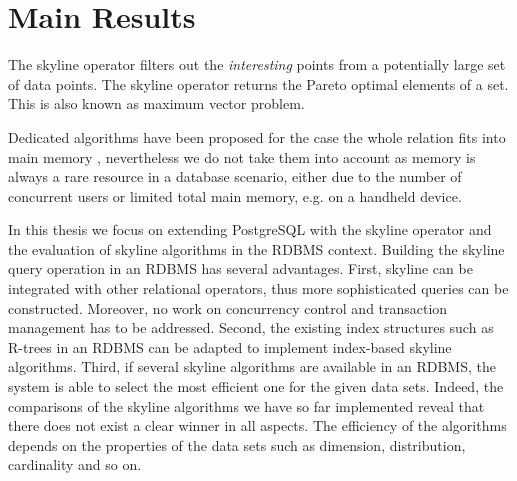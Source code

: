 % 
% 
% 
% 
% 
% 
% 
%


\section{Main Results} 
The skyline operator \citep{Borzsonyi2001} filters out the
\emph{interesting} points from a potentially large set of data
points. The skyline operator returns the Pareto optimal elements of a set. This is also known as maximum vector
problem.

Dedicated algorithms have been proposed for the case the whole relation
fits into main memory \citep{Preparata1985}, nevertheless we do not
take them into account as memory is always a rare resource in a
database scenario, either due to the number of concurrent users or
limited total main memory, e.g. on a handheld device.

In this thesis we focus on extending PostgreSQL with the skyline
operator and the evaluation of skyline algorithms in the RDBMS context.
Building the skyline query operation in an RDBMS has
several advantages.  First, skyline can be integrated with other
relational operators, thus more sophisticated queries can be
constructed.  Moreover, no work on concurrency control and transaction
management has to be addressed.  Second, the existing index structures
such as R-trees in an RDBMS can be adapted to implement index-based
skyline algorithms.  Third, if several skyline algorithms are
available in an RDBMS, the system is able to select the most efficient
one for the given data sets.  Indeed, the comparisons of the skyline
algorithms we have so far implemented reveal that there does not exist
a clear winner in all aspects.  The efficiency of the algorithms
depends on the properties of the data sets such as dimension,
distribution, cardinality and so on.

